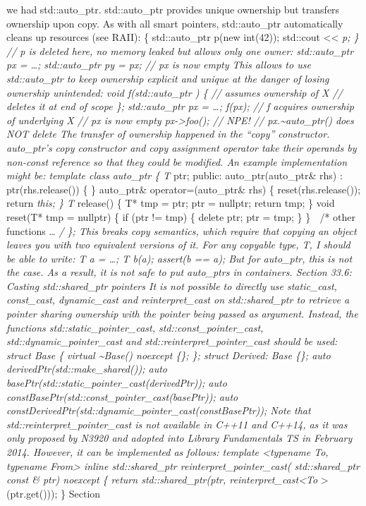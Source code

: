 we had std::auto\_ptr. std::auto\_ptr provides unique ownership but
transfers ownership upon copy. As with all smart pointers,
std::auto\_ptr automatically cleans up resources (see RAII): \{
std::auto\_ptr p(new int(42)); std::cout \textless\textless{} \emph{p;
\} // p is deleted here, no memory leaked but allows only one owner:
std::auto\_ptr px = \ldots; std::auto\_ptr py = px; // px is now empty
This allows to use std::auto\_ptr to keep ownership explicit and unique
at the danger of losing ownership unintended: void f(std::auto\_ptr ) \{
// assumes ownership of X // deletes it at end of scope \};
std::auto\_ptr px = \ldots; f(px); // f acquires ownership of underlying
X // px is now empty px-\textgreater foo(); // NPE! //
px.\textasciitilde auto\_ptr() does NOT delete The transfer of ownership
happened in the ``copy'' constructor. auto\_ptr's copy constructor and
copy assignment operator take their operands by non-const reference so
that they could be modiﬁed. An example implementation might be: template
class auto\_ptr \{ T} ptr; public: auto\_ptr(auto\_ptr\& rhs) :
ptr(rhs.release()) \{ \} auto\_ptr\& operator=(auto\_ptr\& rhs) \{
reset(rhs.release()); return \emph{this; \} T} release() \{ T* tmp =
ptr; ptr = nullptr; return tmp; \} void reset(T* tmp = nullptr) \{ if
(ptr != tmp) \{ delete ptr; ptr = tmp; \} \}  /* other functions
\ldots{} \emph{/ \}; This breaks copy semantics, which require that
copying an object leaves you with two equivalent versions of it. For any
copyable type, T, I should be able to write: T a = \ldots; T b(a);
assert(b == a); But for auto\_ptr, this is not the case. As a result, it
is not safe to put auto\_ptrs in containers. Section 33.6: Casting
std::shared\_ptr pointers It is not possible to directly use
static\_cast, const\_cast, dynamic\_cast and reinterpret\_cast on
std::shared\_ptr to retrieve a pointer sharing ownership with the
pointer being passed as argument. Instead, the functions
std::static\_pointer\_cast, std::const\_pointer\_cast,
std::dynamic\_pointer\_cast and std::reinterpret\_pointer\_cast should
be used: struct Base \{ virtual \textasciitilde Base() noexcept \{\};
\}; struct Derived: Base \{\}; auto derivedPtr(std::make\_shared());
auto basePtr(std::static\_pointer\_cast(derivedPtr)); auto
constBasePtr(std::const\_pointer\_cast(basePtr)); auto
constDerivedPtr(std::dynamic\_pointer\_cast(constBasePtr)); Note that
std::reinterpret\_pointer\_cast is not available in C++11 and C++14, as
it was only proposed by N3920 and adopted into Library Fundamentals TS
in February 2014. However, it can be implemented as follows: template
\textless typename To, typename From\textgreater{} inline
std::shared\_ptr reinterpret\_pointer\_cast( std::shared\_ptr const \&
ptr) noexcept \{ return std::shared\_ptr(ptr,
reinterpret\_cast\textless To }\textgreater(ptr.get())); \} Section
